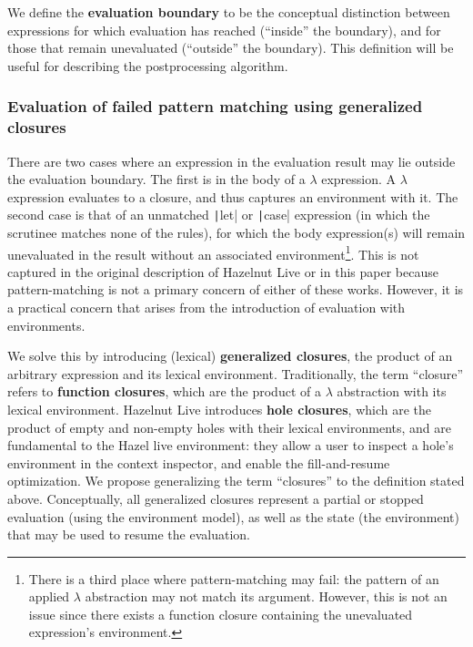 We define the \textbf{evaluation boundary} to be the conceptual distinction between expressions for which evaluation has reached (``inside'' the boundary), and for those that remain unevaluated (``outside'' the boundary). This definition will be useful for describing the postprocessing algorithm.

\subsubsection{Evaluation of failed pattern matching using generalized closures}
\label{sec:failed_pattern_match}

There are two cases where an expression in the evaluation result may lie outside the evaluation boundary. The first is in the body of a $\lambda$ expression. A $\lambda$ expression evaluates to a closure, and thus captures an environment with it. The second case is that of an unmatched \texttt|let| or \texttt|case| expression (in which the scrutinee matches none of the rules), for which the body expression(s) will remain unevaluated in the result without an associated environment\footnote{There is a third place where pattern-matching may fail: the pattern of an applied $\lambda$ abstraction may not match its argument. However, this is not an issue since there exists a function closure containing the unevaluated expression's environment.}. This is not captured in the original description of Hazelnut Live \cite{conf/popl/HazelnutLive19} or in this paper because pattern-matching is not a primary concern of either of these works. However, it is a practical concern that arises from the introduction of evaluation with environments.

We solve this by introducing (lexical) \textbf{generalized closures}, the product of an arbitrary expression and its lexical environment. Traditionally, the term ``closure'' refers to \textbf{function closures}, which are the product of a $\lambda$ abstraction with its lexical environment. Hazelnut Live \cite{conf/popl/HazelnutLive19} introduces \textbf{hole closures}, which are the product of empty and non-empty holes with their lexical environments, and are fundamental to the Hazel live environment: they allow a user to inspect a hole's environment in the context inspector, and enable the fill-and-resume optimization. We propose generalizing the term ``closures'' to the definition stated above. Conceptually, all generalized closures represent a partial or stopped evaluation (using the environment model), as well as the state (the environment) that may be used to resume the evaluation.

